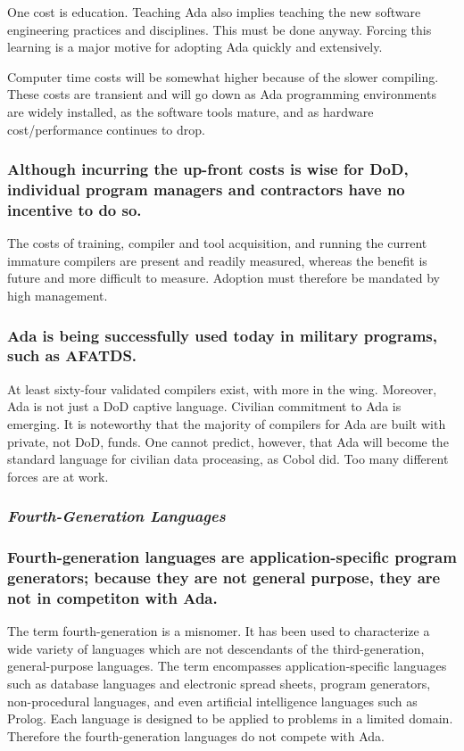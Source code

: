 \documentclass[12pt,final]{article}
\begin{document}
One cost is education. Teaching Ada also implies teaching the new software
engineering practices and disciplines. This must be done anyway. Forcing this
learning is a major motive for adopting Ada quickly and extensively.

Computer time costs will be somewhat higher because of the slower compiling.
These costs are transient and will go down as Ada programming environments are
widely installed, as the software tools mature, and as hardware
cost/performance continues to drop.

\subsubsection*{Although incurring the up-front costs is wise for DoD,
individual program managers and contractors have no incentive to do so.}

The costs of training, compiler and tool acquisition, and running the current
immature compilers are present and readily measured, whereas the benefit is
future and more difficult to measure. Adoption must therefore be mandated by
high management.

\subsubsection*{Ada is being successfully used today in military programs, such
as AFATDS.}

At least sixty-four validated compilers exist, with more in the wing. Moreover,
Ada is not just a DoD captive language. Civilian commitment to Ada is emerging.
It is noteworthy that the majority of compilers for Ada are built with private,
not DoD, funds.  One cannot predict, however, that Ada will become the standard
language for civilian data proceasing, as Cobol did. Too many different forces
are at work.

\subsubsection*{\textit{Fourth-Generation Languages}}

\subsubsection*{Fourth-generation languages are application-specific program
generators; because they are not general purpose, they are not in competiton
with Ada.}

The term fourth-generation is a misnomer. It has been used to characterize a
wide variety of languages which are not descendants of the third-generation,
general-purpose languages. The term encompasses application-specific languages
such as database languages and electronic spread sheets, program generators,
non-procedural languages, and even artificial intelligence languages such as
Prolog. Each language is designed to be applied to problems in a limited
domain. Therefore the fourth-generation languages do not compete with Ada.
\end{document}
